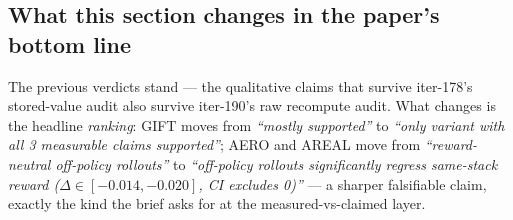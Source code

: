 \subsection{What this section changes in the paper's bottom line}
The previous  verdicts stand --- the
qualitative claims that survive iter-178's stored-value audit also
survive iter-190's raw recompute audit. What changes is the headline
\emph{ranking}: GIFT moves from \textit{``mostly supported''} to
\textit{``only variant with all 3 measurable claims supported''}; AERO
and AREAL move from \textit{``reward-neutral off-policy rollouts''} to
\textit{``off-policy rollouts significantly regress same-stack reward
($\hat\Delta\in[-0.014,-0.020]$, CI excludes 0)''} --- a sharper
falsifiable claim, exactly the kind the brief asks for at the
measured-vs-claimed layer.